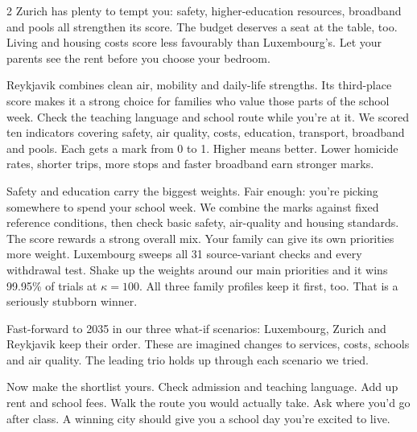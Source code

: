 \documentclass{mcmthesis}
\begin{document}
\begin{multicols}{2}
Zurich has plenty to tempt you: safety, higher-education resources, broadband and pools all strengthen its score. The budget deserves a seat at the table, too. Living and housing costs score less favourably than Luxembourg's. Let your parents see the rent before you choose your bedroom.

Reykjavik combines clean air, mobility and daily-life strengths. Its third-place score makes it a strong choice for families who value those parts of the school week. Check the teaching language and school route while you're at it.
We scored ten indicators covering safety, air quality, costs, education, transport, broadband and pools. Each gets a mark from 0 to 1. Higher means better. Lower homicide rates, shorter trips, more stops and faster broadband earn stronger marks.

Safety and education carry the biggest weights. Fair enough: you're picking somewhere to spend your school week. We combine the marks against fixed reference conditions, then check basic safety, air-quality and housing standards. The score rewards a strong overall mix. Your family can give its own priorities more weight.
Luxembourg sweeps all 31 source-variant checks and every withdrawal test. Shake up the weights around our main priorities and it wins 99.95\% of trials at $\kappa=100$. All three family profiles keep it first, too. That is a seriously stubborn winner.

Fast-forward to 2035 in our three what-if scenarios: Luxembourg, Zurich and Reykjavik keep their order. These are imagined changes to services, costs, schools and air quality. The leading trio holds up through each scenario we tried.

Now make the shortlist yours. Check admission and teaching language. Add up rent and school fees. Walk the route you would actually take. Ask where you'd go after class. A winning city should give you a school day you're excited to live.
\end{multicols}
\vspace{12pt}
\newcommand\stat[2]{\begin{minipage}[t]{.235\linewidth}\raggedright\setlength{\parskip}{0pt}
{\color{NewsRed}\rule{\linewidth}{1.2pt}}\par\vspace{2pt}
{\sffamily\bfseries\fontsize{15.5}{17}\selectfont\color{Ink}#1}\par\vspace{1pt}
{\sffamily\footnotesize\color{Muted}#2\par}\end{minipage}}
\end{document}
